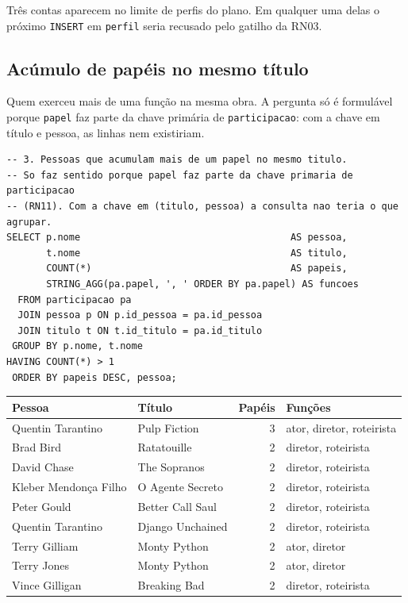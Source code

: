 \documentclass[a4paper,12pt,oneside,openany]{book}
\newcommand{\bd}[1]{\texttt{#1}}
\begin{document}
Três contas aparecem no limite de perfis do plano. Em qualquer uma delas o
próximo \bd{INSERT} em \bd{perfil} seria recusado pelo gatilho da RN03.

\subsection{Acúmulo de papéis no mesmo título}

Quem exerceu mais de uma função na mesma obra. A pergunta só é formulável
porque \bd{papel} faz parte da chave primária de \bd{participacao}: com a
chave em título e pessoa, as linhas nem existiriam.

\begin{lstlisting}[caption={Acúmulo de papéis no mesmo título.},label={lst:consulta3},basicstyle=\ttfamily\scriptsize]
-- 3. Pessoas que acumulam mais de um papel no mesmo titulo.
-- So faz sentido porque papel faz parte da chave primaria de participacao
-- (RN11). Com a chave em (titulo, pessoa) a consulta nao teria o que agrupar.
SELECT p.nome                                     AS pessoa,
       t.nome                                     AS titulo,
       COUNT(*)                                   AS papeis,
       STRING_AGG(pa.papel, ', ' ORDER BY pa.papel) AS funcoes
  FROM participacao pa
  JOIN pessoa p ON p.id_pessoa = pa.id_pessoa
  JOIN titulo t ON t.id_titulo = pa.id_titulo
 GROUP BY p.nome, t.nome
HAVING COUNT(*) > 1
 ORDER BY papeis DESC, pessoa;
\end{lstlisting}

\begin{table}[ht]
\centering
\begin{tabular}{llr l}
\toprule
\textbf{Pessoa} & \textbf{Título} & \textbf{Papéis} & \textbf{Funções} \\
\midrule
Quentin Tarantino     & Pulp Fiction      & 3 & ator, diretor, roteirista \\
Brad Bird             & Ratatouille       & 2 & diretor, roteirista \\
David Chase           & The Sopranos      & 2 & diretor, roteirista \\
Kleber Mendonça Filho & O Agente Secreto  & 2 & diretor, roteirista \\
Peter Gould           & Better Call Saul  & 2 & diretor, roteirista \\
Quentin Tarantino     & Django Unchained  & 2 & diretor, roteirista \\
Terry Gilliam         & Monty Python      & 2 & ator, diretor \\
Terry Jones           & Monty Python      & 2 & ator, diretor \\
Vince Gilligan        & Breaking Bad      & 2 & diretor, roteirista \\
\bottomrule
\end{tabular}
\end{table}
\end{document}
